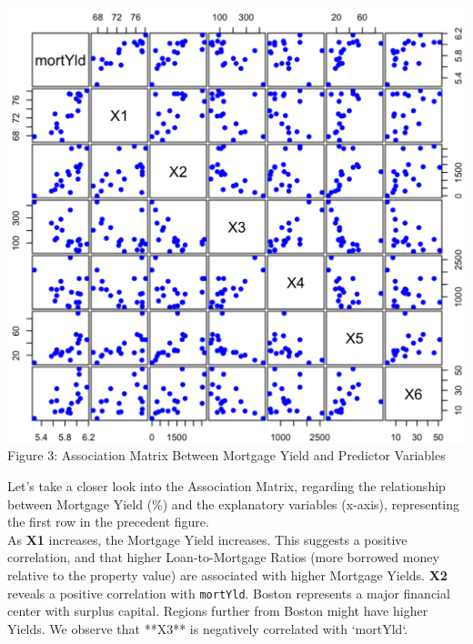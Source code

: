 \documentclass[
  12pt,
]{article}
\begin{document}
\begin{minipage}{0.45\textwidth}
\centering
\includegraphics[width=1\linewidth]{figures/Figure 3.png}
\\
\small Figure 3: Association Matrix Between Mortgage Yield and Predictor Variables
\end{minipage}
\hfill
\begin{minipage}{0.48\textwidth}
\vspace{0pt}
Let's take a closer look into the Association Matrix, regarding the relationship between Mortgage Yield (\%) and the explanatory variables (x-axis), representing the first row in the precedent figure.
\\
As \textbf{X1} increases, the Mortgage Yield increases. This suggests a positive correlation, and that higher Loan-to-Mortgage Ratios (more borrowed money relative to the property value) are associated with higher Mortgage Yields. \textbf{X2} reveals a positive correlation with \texttt{mortYld}. Boston represents a major financial center with surplus capital. Regions further from Boston might have higher Yields. We observe that **X3** is negatively correlated with `mortYld`.
\end{minipage}
\addtocounter{figure}{1}
\vspace{1em}
\end{document}
